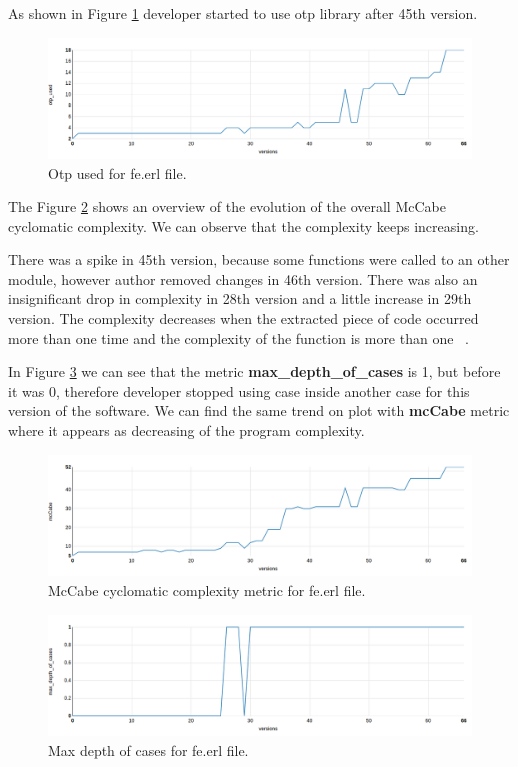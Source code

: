 As shown in Figure \ref{fig:otp_iron} developer started to use otp library after 45th version. 

\begin{figure}[ht]
	\centering
	\includegraphics[width=\textwidth]{figures/otp_iron.png}
	\caption{Otp used for fe.erl file.}
	\label{fig:otp_iron}
\end{figure}

The Figure \ref{fig:mcCabe_iron} shows an overview of the evolution of the overall McCabe cyclomatic complexity. We can observe that the complexity keeps increasing.

There was a spike in 45th version, because some functions were called to an other module, however author removed changes in 46th version. There was also an insignificant drop in complexity in 28th version and a little increase in 29th version. The  complexity decreases  when  the  extracted  piece  of code occurred more than one time and the complexity of the function is more than one ~\cite{mcCabe}. 

In Figure \ref{fig:max_depth_of_cases_iron} we can see that the metric \textbf{max\_depth\_of\_cases} is 1, but before it was 0, therefore developer stopped using case inside another case for this version of the software. We can find the same trend on plot with \textbf{mcCabe} metric where it appears as decreasing of the program complexity.  

\begin{figure}[ht]
	\centering
	\includegraphics[width=\textwidth]{figures/mcCabe_iron.png}
	\caption{McCabe cyclomatic complexity metric for fe.erl file.}
	\label{fig:mcCabe_iron}
\end{figure}

\begin{figure}[ht]
	\centering
	\includegraphics[width=\textwidth]{figures/max_depth_of_cases_iron.png}
	\caption{Max depth of cases for fe.erl file.}
	\label{fig:max_depth_of_cases_iron}
\end{figure}

